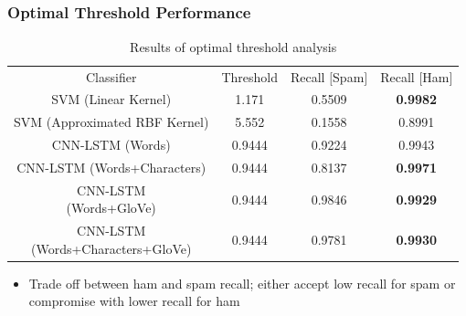 \documentclass{beamer}
\begin{document}
\subsection{}
\begin{framefont}{\footnotesize}
	\begin{frame}
		\frametitle{Optimal Threshold Performance}
		\begin{table}
			\centering
			\bgroup
			\def\arraystretch{1.5}
			\begin{tabular}{|c|c|c|c|} \hline
				Classifier & Threshold & Recall $\lbrack$Spam$\rbrack$ & Recall $\lbrack$Ham$\rbrack$ \\ \hhline{|=|=|=|=|}
				SVM (Linear Kernel) & 1.171 & \color{red} 0.5509 & \textbf{0.9982} \\ \hline
				SVM (Approximated RBF Kernel) & 5.552 & 0.1558 & 0.8991 \\ \hline
				CNN-LSTM (Words) & 0.9444 & 0.9224 & 0.9943 \\ \hline
				CNN-LSTM (Words+Characters) & 0.9444  & \color{red} 0.8137 &  \textbf{0.9971} \\ \hline
				\makecell{CNN-LSTM \\(Words+GloVe)} & 0.9444  & \color{ao(english)} 0.9846  & \textbf{0.9929} \\ \hline
				\makecell{CNN-LSTM \\(Words+Characters+GloVe)} & 0.9444 & \color{ao(english)} 0.9781 & \textbf{0.9930} \\ \hline
			\end{tabular}
			\egroup
			\caption{Results of optimal threshold analysis}
		\end{table}
		\vspace{-10pt}
		\begin{itemize}
			\item Trade off between ham and spam recall; either accept low recall for spam or compromise with lower recall for ham
		\end{itemize}
	\end{frame}
\end{framefont}
\end{document}

